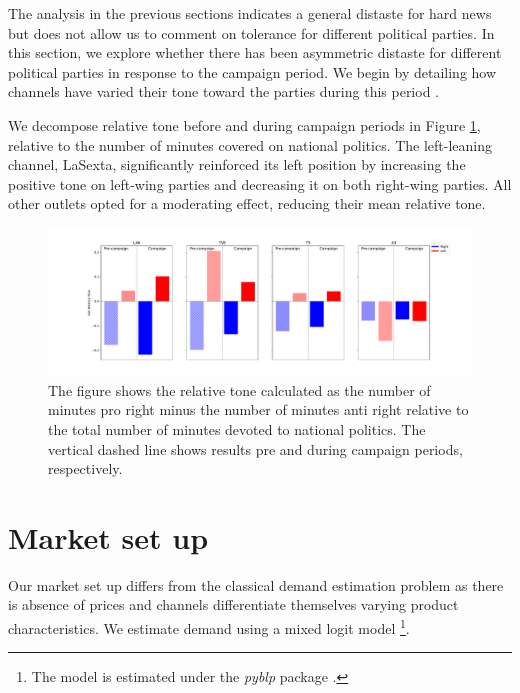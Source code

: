 \documentclass[12pt]{article}
\begin{document}
The analysis in the previous sections indicates a general distaste for hard news but does not allow us to comment on tolerance for different political parties. In this section, we explore whether there has been asymmetric distaste for different political parties in response to the campaign period. We begin by detailing how channels have varied their tone toward the parties during this period \citep{independent2023vox}.

We decompose relative tone before and during campaign periods in Figure \ref{fig:tone2}, relative to the number of minutes covered on national politics. The left-leaning channel, LaSexta, significantly reinforced its left position by increasing the positive tone on left-wing parties and decreasing it on both right-wing parties. All other outlets opted for a moderating effect, reducing their mean relative tone.

\begin{figure}[h!]
	\centering
	\includegraphics[width=180mm]{figures/average_tone_pre_post_election}
	\caption{The figure shows the relative tone calculated as the number of minutes pro right minus the number of minutes anti right relative to the total number of minutes devoted to national politics. The vertical dashed line shows results pre and during campaign periods, respectively. }
	\label{fig:tone2}
\end{figure}





\section{Market set up}\label{section:market}

Our market set up differs from the classical demand estimation problem as there is absence of prices and channels differentiate themselves varying product characteristics. We estimate demand using a mixed logit model \citep{berry1994estimating} \footnote{The model is estimated under the \textit{pyblp} package \citep{conlon2020best}.}.
\end{document}
